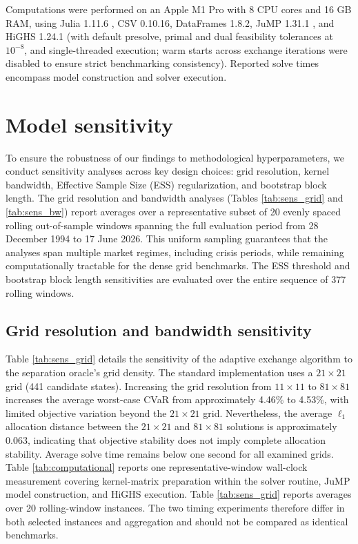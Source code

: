 \documentclass[smallcondensed]{svjour3}
\begin{document}
Computations were performed on an Apple M1 Pro with 8 CPU cores and 16 GB RAM, using Julia 1.11.6 \cite{bezanson2017julia}, CSV 0.10.16, DataFrames 1.8.2, JuMP 1.31.1 \cite{dunning2017jump}, and HiGHS 1.24.1 \cite{huangfu2018parallelizing} (with default presolve, primal and dual feasibility tolerances at $10^{-8}$, and single-threaded execution; warm starts across exchange iterations were disabled to ensure strict benchmarking consistency). Reported solve times encompass model construction and solver execution.

\section{Model sensitivity}\label{sec:sensitivity}
To ensure the robustness of our findings to methodological hyperparameters, we conduct sensitivity analyses across key design choices: grid resolution, kernel bandwidth, Effective Sample Size (ESS) regularization, and bootstrap block length. The grid resolution and bandwidth analyses (Tables \ref{tab:sens_grid} and \ref{tab:sens_bw}) report averages over a representative subset of 20 evenly spaced rolling out-of-sample windows spanning the full evaluation period from 28 December 1994 to 17 June 2026. This uniform sampling guarantees that the analyses span multiple market regimes, including crisis periods, while remaining computationally tractable for the dense grid benchmarks. The ESS threshold and bootstrap block length sensitivities are evaluated over the entire sequence of 377 rolling windows.

\subsection{Grid resolution and bandwidth sensitivity}
Table \ref{tab:sens_grid} details the sensitivity of the adaptive exchange algorithm to the separation oracle's grid density. The standard implementation uses a $21\times21$ grid (441 candidate states). Increasing the grid resolution from $11\times11$ to $81\times81$ increases the average worst-case CVaR from approximately 4.46\% to 4.53\%, with limited objective variation beyond the $21\times21$ grid. Nevertheless, the average $\ell_1$ allocation distance between the $21\times21$ and $81\times81$ solutions is approximately 0.063, indicating that objective stability does not imply complete allocation stability. Average solve time remains below one second for all examined grids. Table \ref{tab:computational} reports one representative-window wall-clock measurement covering kernel-matrix preparation within the solver routine, JuMP model construction, and HiGHS execution. Table \ref{tab:sens_grid} reports averages over 20 rolling-window instances. The two timing experiments therefore differ in both selected instances and aggregation and should not be compared as identical benchmarks.
\end{document}
